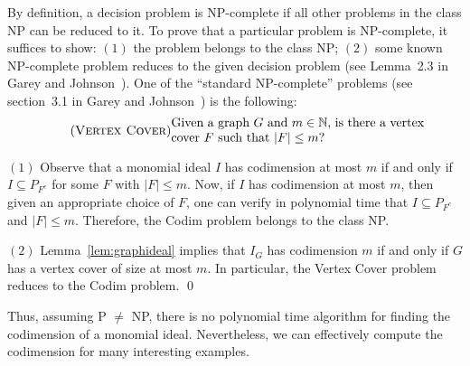 By definition, a decision problem is NP-complete if
all other problems in the class NP can be reduced to it.  To prove
that a particular problem is NP-complete, it suffices to show: $(1)$
the problem belongs to the class NP; $(2)$ some known NP-complete
problem reduces to the given decision problem (see Lemma~2.3 in Garey
and Johnson~\cite{MR80g:68056}).  One of the ``standard NP-complete''
problems (see section~3.1 in Garey and Johnson~\cite{MR80g:68056}) is
the following:
\begin{equation} \tag{{\sc Vertex Cover}}
\text{\begin{minipage}[c]{200pt} Given a graph $G$ and $m \in \bbbn$,
is there a vertex cover $F$ such that $|F| \leq m$? \end{minipage}}
\end{equation}

\begin{sproof}
$(1)$ Observe that a monomial ideal $I$ has codimension at most $m$ if
and only if $I \subseteq P_{F^{c}}$ for some $F$ with $|F|
\leq m$.  Now, if $I$ has codimension at most $m$, then given an
appropriate choice of $F$, one can verify in polynomial time that $I
\subseteq P_{F^{c}}$ and $|F| \leq m$.  Therefore, the {\sc
Codim} problem belongs to the class NP.

$(2)$ Lemma~\ref{lem:graphideal} implies that $I_{G}$ has codimension
$m$ if and only if $G$ has a vertex cover of size at most $m$.  In
particular, the {\sc Vertex Cover} problem reduces to the {\sc Codim}
problem. \qed
\end{sproof}

Thus, assuming P $\neq$ NP, there is no polynomial time algorithm for
finding the codimension of a monomial ideal.  Nevertheless, we can
effectively compute the codimension for many interesting examples.

